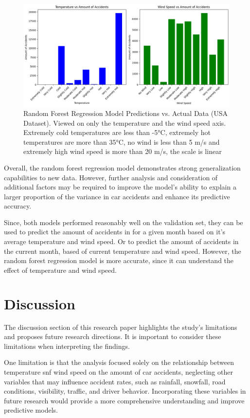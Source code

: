 \documentclass{article}
\begin{document}
\begin{figure}
    \centering
    \includegraphics[scale=0.4]{../figures/highres/usa_model_2d.png}
    \caption{Random Forest Regression Model Predictions vs. Actual Data (USA Dataset). Viewed on only the temperature  and the wind speed axis. Extremely cold temperatures are less than -5°C, extremely hot temperatures are more than 35°C, no wind is less than 5 m/s and extremely high wind speed is more than 20 m/s, the scale is linear}
    \label{fig:usa_model_2d}
\end{figure}


Overall, the random forest regression model demonstrates strong generalization capabilities to new data. However, further analysis and consideration of additional factors may be required to improve the model's ability to explain a larger proportion of the variance in car accidents and enhance its predictive accuracy.


Since, both models performed reasonably well on the validation set, they can be used to predict the amount of accidents in for a given month based on it's average temperature and wind speed. Or to predict the amount of accidents in the current month, based of current temperature and wind speed. However, the random forest regression model is more accurate, since it can understand the effect of temperature and wind speed.

\newpage
\section{Discussion}

The discussion section of this research paper highlights the study's limitations and proposes future research directions. It is important to consider these limitations when interpreting the findings.

One limitation is that the analysis focused solely on the relationship between temperature snf wind speed on the amount of car accidents, neglecting other variables that may influence accident rates, such as rainfall, snowfall, road conditions, visibility, traffic, and driver behavior. Incorporating these variables in future research would provide a more comprehensive understanding and improve predictive models.
\end{document}
